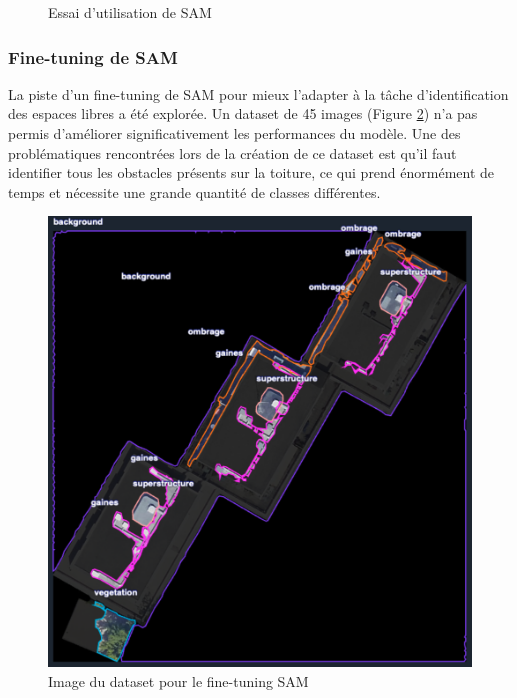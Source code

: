 \begin{figure}[H]
    \caption{Essai d'utilisation de SAM}
    \label{fig:essai_algo_sam}
\end{figure}

\subsubsection{Fine-tuning de SAM}
\label{subsubsec:fine_tuning_sam}
La piste d'un fine-tuning de SAM pour mieux l'adapter à la tâche d'identification des espaces libres a été explorée. Un dataset de 45 images (Figure \ref{fig:ch3_piste_exploree_classification_11_fine_tuning_dataset}) n'a pas permis d'améliorer significativement les performances du modèle. Une des problématiques rencontrées lors de la création de ce dataset est qu'il faut identifier tous les obstacles présents sur la toiture, ce qui prend énormément de temps et nécessite une grande quantité de classes différentes.

\begin{figure}[H]
    \centering
    \includegraphics[width=1\linewidth]{02-main/figures/ch3/ch3_piste_exploree_classification_11_fine_tuning_dataset.png}
    \caption{Image du dataset pour le fine-tuning SAM}
    \label{fig:ch3_piste_exploree_classification_11_fine_tuning_dataset}
\end{figure}

